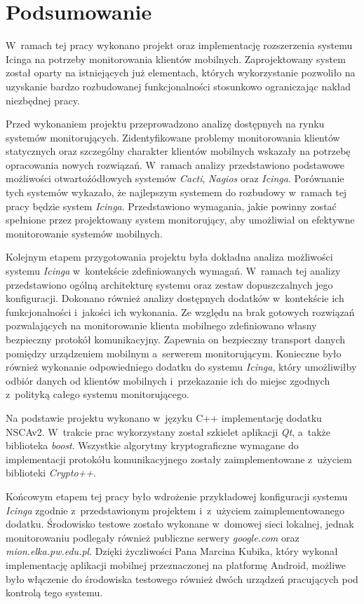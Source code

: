 \chapter{Podsumowanie}
\label{chap:Podsumowanie}

W~ramach tej pracy wykonano projekt oraz implementację rozszerzenia
systemu Icinga na potrzeby monitorowania klientów mobilnych.
Zaprojektowany system został oparty na istniejących już elementach,
których wykorzystanie pozwoliło na uzyskanie bardzo rozbudowanej
funkcjonalności stosunkowo ograniczając nakład niezbędnej pracy.

Przed wykonaniem projektu przeprowadzono analizę dostępnych na rynku
systemów monitorujących. Zidentyfikowane problemy monitorowania
klientów statycznych oraz szczególny charakter klientów mobilnych
wskazały na potrzebę opracowania nowych rozwiązań.  W~ramach analizy
przedstawiono podstawowe możliwości otwartoźódłowych systemów {\em
  Cacti}, {\em Nagios} oraz {\em Icinga}. Porównanie tych systemów
wykazało, że najlepszym systemem do rozbudowy w~ramach tej pracy
będzie system {\em Icinga}.  Przedstawiono wymagania, jakie powinny
zostać spełnione przez projektowany system monitorujący, aby
umożliwiał on efektywne monitorowanie systemów mobilnych.

Kolejnym etapem przygotowania projektu była dokładna analiza
możliwości systemu {\em Icinga} w~kontekście zdefiniowanych
wymagań. W~ramach tej analizy przedstawiono ogólną architekturę
systemu oraz zestaw dopuszczalnych jego konfiguracji. Dokonano również
analizy dostępnych dodatków w~kontekście ich funkcjonalności i~jakości
ich wykonania. Ze względu na brak gotowych rozwiązań pozwalających na
monitorowanie klienta mobilnego zdefiniowano własny bezpieczny
protokół komunikacyjny. Zapewnia on bezpieczny transport danych
pomiędzy urządzeniem mobilnym a~serwerem monitorującym. Konieczne było
również wykonanie odpowiedniego dodatku do systemu {\em Icinga}, który
umożliwiłby odbiór danych od klientów mobilnych i~przekazanie ich do
miejsc zgodnych z~polityką całego systemu
monitorującego. 

Na podstawie projektu wykonano w~języku C++ implementację dodatku
NSCAv2. W~trakcie prac wykorzystany został szkielet aplikacji {\em
  Qt}, a~także biblioteka {\em boost}. Wszystkie algorytmy
kryptograficzne wymagane do implementacji protokółu komunikacyjnego
zostały zaimplementowane z~użyciem biblioteki {\em Crypto++}.

Końcowym etapem tej pracy było wdrożenie przykładowej konfiguracji
systemu {\em Icinga} zgodnie z~przedstawionym projektem i~z~użyciem
zaimplementowanego dodatku. Środowisko testowe zostało wykonane
w~domowej sieci lokalnej, jednak monitorowaniu podlegały również
publiczne serwery {\em google.com} oraz {\em
  mion.elka.pw.edu.pl}. Dzięki życzliwości Pana Marcina Kubika, który
wykonał implementację aplikacji mobilnej przeznaczonej na platformę
Android, możliwe było włączenie do środowiska testowego również dwóch
urządzeń pracujących pod kontrolą tego systemu.

